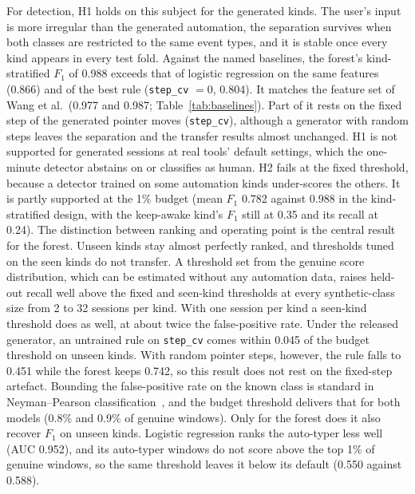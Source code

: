 \documentclass[sensors,article,submit,pdftex,oneauthor]{Definitions/mdpi}
\begin{document}
For detection, H1 holds on this subject for the generated kinds. The user's input is more irregular than the generated automation, the separation survives when both classes are restricted to the same event types, and it is stable once every kind appears in every test fold. Against the named baselines, the forest's kind-stratified $F_1$ of 0.988 exceeds that of logistic regression on the same features (0.866) and of the best rule (\texttt{step\_cv} $= 0$, 0.804). It matches the feature set of Wang et al.\ (0.977 and 0.987; Table~\ref{tab:baselines}). Part of it rests on the fixed step of the generated pointer moves (\texttt{step\_cv}), although a generator with random steps leaves the separation and the transfer results almost unchanged. H1 is not supported for generated sessions at real tools' default settings, which the one-minute detector abstains on or classifies as human. H2 fails at the fixed threshold, because a detector trained on some automation kinds under-scores the others. It is partly supported at the 1\% budget (mean $F_1$ 0.782 against 0.988 in the kind-stratified design, with the keep-awake kind's $F_1$ still at 0.35 and its recall at 0.24). The distinction between ranking and operating point is the central result for the forest. Unseen kinds stay almost perfectly ranked, and thresholds tuned on the seen kinds do not transfer. A threshold set from the genuine score distribution, which can be estimated without any automation data, raises held-out recall well above the fixed and seen-kind thresholds at every synthetic-class size from 2 to 32 sessions per kind. With one session per kind a seen-kind threshold does as well, at about twice the false-positive rate. Under the released generator, an untrained rule on \texttt{step\_cv} comes within 0.045 of the budget threshold on unseen kinds. With random pointer steps, however, the rule falls to 0.451 while the forest keeps 0.742, so this result does not rest on the fixed-step artefact. Bounding the false-positive rate on the known class is standard in Neyman--Pearson classification~\cite{tong2018neyman}, and the budget threshold delivers that for both models (0.8\% and 0.9\% of genuine windows). Only for the forest does it also recover $F_1$ on unseen kinds. Logistic regression ranks the auto-typer less well (AUC 0.952), and its auto-typer windows do not score above the top 1\% of genuine windows, so the same threshold leaves it below its default (0.550 against 0.588).
\end{document}
